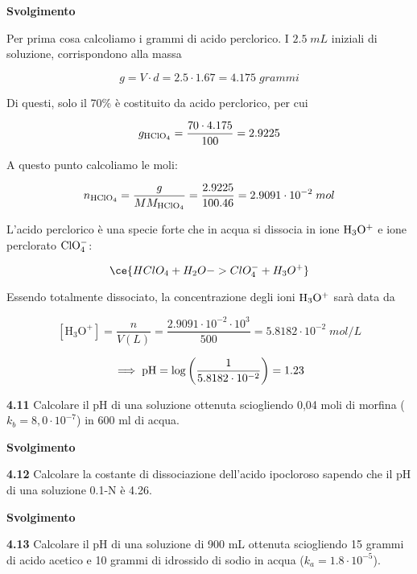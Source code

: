 \vspace{0.2cm}\large\textbf{Svolgimento}\normalsize

\vspace{0.2cm}Per prima cosa calcoliamo i grammi di acido perclorico. I $2.5\;mL$ iniziali di soluzione, corrispondono alla massa

$$g=V \cdot d=2.5 \cdot 1.67=4.175\;grammi$$

Di questi, solo il 70\% è costituito da acido perclorico, per cui

$$g_{\rm HClO_4}=\frac{70 \cdot 4.175}{100}=2.9225$$

A questo punto calcoliamo le moli:

$$n_{\rm HClO_4}
=\frac{g}{MM_{\rm HClO_4}}
=\frac{2.9225}{100.46}=2.9091 \cdot 10^{-2}\;mol$$

L'acido perclorico è una specie forte che in acqua si dissocia in ione $\rm H_3O^+$ e ione perclorato $\rm ClO_4^-$:

$$\ce{HClO_4 + H_2O -> ClO_4^- + H_3O^+}$$

Essendo totalmente dissociato, la concentrazione degli ioni $\rm H_3O^+$ sarà data da

$$[\text{H}_3\text{O}^+]=\frac{n}{V(L)}=\frac{2.9091 \cdot 10^{-2} \cdot 10^{3}}{500}=5.8182 \cdot 10^{-2}\;mol/L$$

$$\implies \rm pH=\log{\left( \frac{1}{5.8182 \cdot 10^{-2}} \right)}=1.23$$

\vspace{0.2cm}\textbf{4.11} Calcolare il pH di una soluzione ottenuta sciogliendo 0,04 moli di morfina ($k_b = 8,0 \cdot 10^{-7}$) in 600 ml di acqua.

\vspace{0.2cm}\large\textbf{Svolgimento}\normalsize

\vspace{0.2cm}

\vspace{0.2cm}\textbf{4.12} Calcolare la costante di dissociazione dell'acido ipocloroso sapendo che il pH di una soluzione 0.1-N è 4.26.

\vspace{0.2cm}\large\textbf{Svolgimento}\normalsize

\vspace{0.2cm}

\vspace{0.2cm}\textbf{4.13} Calcolare il pH di una soluzione di 900 mL ottenuta sciogliendo 15 grammi di acido acetico e 10 grammi di idrossido di sodio in acqua ($k_a = 1.8 \cdot 10^{-5}$).


